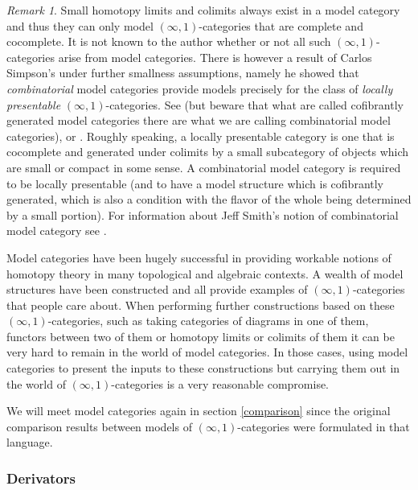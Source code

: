 \documentclass{conm-p-l}
\theoremstyle{definition} \newtheorem{definition}[theorem]{Definition}
\theoremstyle{remark} \newtheorem{remark}[theorem]{Remark}
\numberwithin{equation}{section}
\newcommand{\oo}{\infty}
\newcommand{\io}{$(\oo,1)$}
\begin{document}
\begin{remark}
  Small homotopy limits and colimits always exist in a model category
  and thus they can only model \io-categories that are complete and
  cocomplete. It is not known to the author whether or not all such
  \io-categories arise from model categories. There is however a
  result of Carlos Simpson's under further smallness assumptions,
  namely he showed that \emph{combinatorial} model categories provide
  models precisely for the class of \emph{locally presentable}
  \io-categories.  See \cite{SimpsonPres} (but beware that what are
  called cofibrantly generated model categories there are what we are
  calling combinatorial model categories), or \cite[Section
  5.5.1]{HTT}. Roughly speaking, a locally presentable category is one
  that is cocomplete and generated under colimits by a small
  subcategory of objects which are small or compact in some sense. A
  combinatorial model category is required to be locally presentable
  (and to have a model structure which is cofibrantly generated, which
  is also a condition with the flavor of the whole being determined by
  a small portion). For information about Jeff Smith's notion of
  combinatorial model category see \cite[Appendix A.2.6]{HTT}.
\end{remark}

Model categories have been hugely successful in providing workable
notions of homotopy theory in many topological and algebraic contexts.
A wealth of model structures have been constructed and all provide
examples of \io-categories that people care about. When performing
further constructions based on these \io-categories, such as taking
categories of diagrams in one of them, functors between two of them or
homotopy limits or colimits of them it can be very hard to remain in
the world of model categories. In those cases, using model categories
to present the inputs to these constructions but carrying them out in
the world of \io-categories is a very reasonable compromise.

We will meet model categories again in section \ref{comparison} since
the original comparison results between models of \io-categories were
formulated in that language.

\subsubsection{Derivators}
\end{document}
